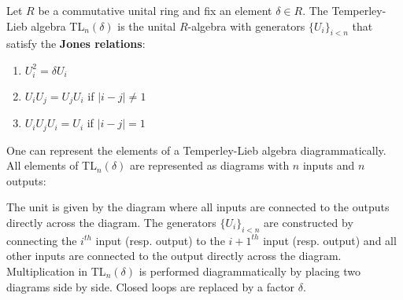     \begin{example}
        Let $R$ be a commutative unital ring and fix an element $\delta\in R$. The Temperley-Lieb algebra TL$_n(\delta)$ is the unital $R$-algebra with generators $\{U_i\}_{i<n}$ that satisfy the \textbf{Jones relations}:
        \begin{enumerate}
            \item $U_i^2 = \delta U_i$
            \item $U_i U_j = U_j U_i$ if $|i-j|\neq 1$
            \item $U_i U_j U_i = U_i$ if $|i-j| = 1$
        \end{enumerate}
        One can represent the elements of a Temperley-Lieb algebra diagrammatically. All elements of TL$_n(\delta)$ are represented as diagrams with $n$ inputs and $n$ outputs:

        \qquad The unit is given by the diagram where all inputs are connected to the outputs directly across the diagram. The generators $\{U_i\}_{i<n}$ are constructed by connecting the $i^{th}$ input (resp. output) to the $i+1^{th}$ input (resp. output) and all other inputs are connected to the output directly across the diagram.
        Multiplication in TL$_n(\delta)$ is performed diagrammatically by placing two diagrams side by side. Closed loops are replaced by a factor $\delta$.


\end{example}
